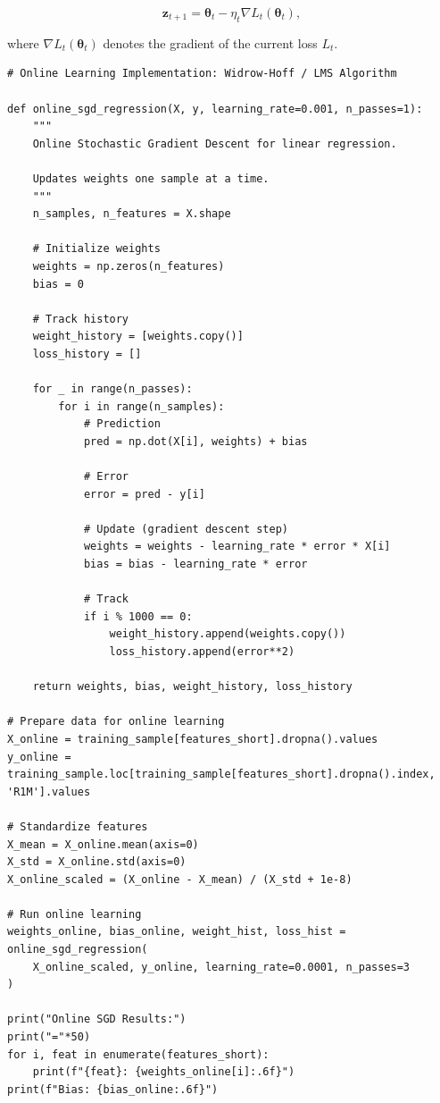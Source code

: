 \begin{equation}
\label{eq:online1}
\textbf{z}_{t+1}=\boldsymbol{\theta}_t-\eta_t\nabla L_t(\boldsymbol{\theta}_t),
\end{equation}

where $\nabla L_t(\boldsymbol{\theta}_t)$ denotes the gradient of the current loss $L_t$.

\begin{verbatim}
# Online Learning Implementation: Widrow-Hoff / LMS Algorithm

def online_sgd_regression(X, y, learning_rate=0.001, n_passes=1):
    """
    Online Stochastic Gradient Descent for linear regression.
    
    Updates weights one sample at a time.
    """
    n_samples, n_features = X.shape
    
    # Initialize weights
    weights = np.zeros(n_features)
    bias = 0
    
    # Track history
    weight_history = [weights.copy()]
    loss_history = []
    
    for _ in range(n_passes):
        for i in range(n_samples):
            # Prediction
            pred = np.dot(X[i], weights) + bias
            
            # Error
            error = pred - y[i]
            
            # Update (gradient descent step)
            weights = weights - learning_rate * error * X[i]
            bias = bias - learning_rate * error
            
            # Track
            if i % 1000 == 0:
                weight_history.append(weights.copy())
                loss_history.append(error**2)
    
    return weights, bias, weight_history, loss_history

# Prepare data for online learning
X_online = training_sample[features_short].dropna().values
y_online = training_sample.loc[training_sample[features_short].dropna().index, 'R1M'].values

# Standardize features
X_mean = X_online.mean(axis=0)
X_std = X_online.std(axis=0)
X_online_scaled = (X_online - X_mean) / (X_std + 1e-8)

# Run online learning
weights_online, bias_online, weight_hist, loss_hist = online_sgd_regression(
    X_online_scaled, y_online, learning_rate=0.0001, n_passes=3
)

print("Online SGD Results:")
print("="*50)
for i, feat in enumerate(features_short):
    print(f"{feat}: {weights_online[i]:.6f}")
print(f"Bias: {bias_online:.6f}")
\end{verbatim}

